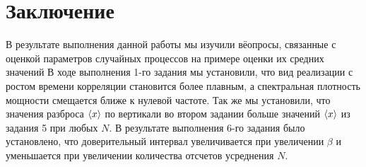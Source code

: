 \documentclass[a4paper,14pt]{extarticle}
\begin{document}
\section*{Заключение}

В результате выполнения данной работы мы изучили вёопросы, связанные с оценкой параметров случайных процессов на примере оценки их средних значений
В ходе выполнения 1-го задания мы установили, что вид реализации с ростом времени корреляции становится более плавным, а спектральная плотность мощности смещается ближе к нулевой частоте.
Так же мы установили, что значения разброса $\langle x\rangle$ по вертикали во втором задании больше значений $\langle x\rangle$ из задания 5 при любых $N$.
В результате выполнения 6-го задания было установлено, что доверительный интервал увеличивается при увеличении $\beta$ и уменьшается при увеличении количества отсчетов усреднения $N$.
\end{document}
